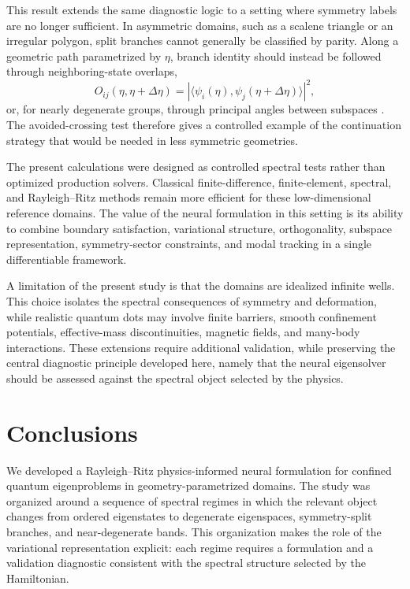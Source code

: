 \documentclass[10pt,onecolumn]{article}
\begin{document}
This result extends the same diagnostic logic to a setting where symmetry labels are no longer sufficient. In asymmetric domains, such as a scalene triangle or an irregular polygon, split branches cannot generally be classified by parity. Along a geometric path parametrized by $\eta$, branch identity should instead be followed through neighboring-state overlaps,
\begin{equation}
O_{ij}(\eta,\eta+\Delta\eta)
=
|\langle \psi_i(\eta),\psi_j(\eta+\Delta\eta)\rangle|^2,
\end{equation}
or, for nearly degenerate groups, through principal angles between subspaces \cite{KnyazevArgentati2002}. The avoided-crossing test therefore gives a controlled example of the continuation strategy that would be needed in less symmetric geometries.

The present calculations were designed as controlled spectral tests rather than optimized production solvers. Classical finite-difference, finite-element, spectral, and Rayleigh--Ritz methods remain more efficient for these low-dimensional reference domains. The value of the neural formulation in this setting is its ability to combine boundary satisfaction, variational structure, orthogonality, subspace representation, symmetry-sector constraints, and modal tracking in a single differentiable framework.

A limitation of the present study is that the domains are idealized infinite wells. This choice isolates the spectral consequences of symmetry and deformation, while realistic quantum dots may involve finite barriers, smooth confinement potentials, effective-mass discontinuities, magnetic fields, and many-body interactions. These extensions require additional validation, while preserving the central diagnostic principle developed here, namely that the neural eigensolver should be assessed against the spectral object selected by the physics.

\section{Conclusions}

We developed a Rayleigh--Ritz physics-informed neural formulation for confined quantum eigenproblems in geometry-parametrized domains. The study was organized around a sequence of spectral regimes in which the relevant object changes from ordered eigenstates to degenerate eigenspaces, symmetry-split branches, and near-degenerate bands. This organization makes the role of the variational representation explicit: each regime requires a formulation and a validation diagnostic consistent with the spectral structure selected by the Hamiltonian.
\end{document}

